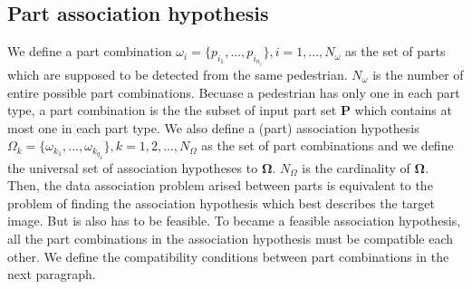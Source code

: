 \documentclass[10pt,twocolumn,letterpaper]{article}
\begin{document}
\subsection{Part association hypothesis}
\label{subsec:part_assocation_hypothesis}
We define a part combination $\omega_i=\{p_{i_1},...,p_{i_{n_i}}\}, i=1,...,N_{\omega}$ as the set of parts which are supposed to be detected from the same pedestrian. $N_{\omega}$ is the number of entire possible part combinations. Becuase a pedestrian has only one in each part type, a part combination is the the subset of input part set $\mathbf{P}$ which contains at most one in each part type.
We also define a (part) association hypothesis $\Omega_k=\{\omega_{k_1},...,\omega_{k_{q_k}}\}, k=1,2,...,N_{\Omega}$ as the set of part combinations and we define the universal set of association hypotheses to $\mathbf{\Omega}$. $N_{\Omega}$ is the cardinality of $\mathbf{\Omega}$.
Then, the data association problem arised between parts is equivalent to the problem of finding the association hypothesis which best describes the target image.
But is also has to be feasible.
To became a feasible association hypothesis, all the part combinations in the association hypothesis must be compatible each other.
We define the compatibility conditions between part combinations in the next paragraph.
\end{document}
